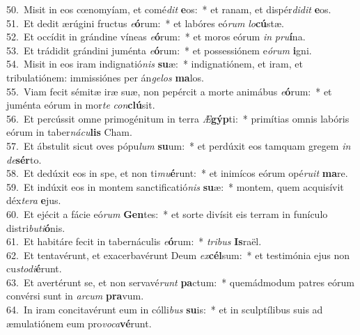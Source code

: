 {50.~}Misit in eos cœnomyíam, et comé\textit{dit} \textbf{e}os:~* et ranam, et dispér\textit{di}\textit{dit} \textbf{e}os.\\
{51.~}Et dedit ærúgini fructus \textit{e}\textbf{ó}rum:~* et labóres eó\textit{rum} \textit{lo}\textbf{cú}stæ.\\
{52.~}Et occídit in grándine víneas \textit{e}\textbf{ó}rum:~* et moros eórum \textit{in} \textit{pru}\textbf{í}na.\\
{53.~}Et trádidit grándini juménta \textit{e}\textbf{ó}rum:~* et possessiónem e\textit{ó}\textit{rum} \textbf{i}gni.\\
{54.~}Misit in eos iram indignatió\textit{nis} \textbf{su}æ:~* indignatiónem, et iram, et tribulatiónem: immissiónes per án\textit{ge}\textit{los} \textbf{ma}los.\\
{55.~}Viam fecit sémitæ iræ suæ, non pepércit a morte animábus \textit{e}\textbf{ó}rum:~* et juménta eórum in mor\textit{te} \textit{con}\textbf{clú}sit.\\
{56.~}Et percússit omne primogénitum in terra \textit{Æ}\textbf{gýp}ti:~* primítias omnis labóris eórum in taber\textit{ná}\textit{cu}\textbf{lis} Cham.\\
{57.~}Et ábstulit sicut oves pópu\textit{lum} \textbf{su}um:~* et perdúxit eos tamquam gregem \textit{in} \textit{de}\textbf{sér}to.\\
{58.~}Et dedúxit eos in spe, et non ti\textit{mu}\textbf{é}runt:~* et inimícos eórum opé\textit{ru}\textit{it} \textbf{ma}re.\\
{59.~}Et indúxit eos in montem sanctificatió\textit{nis} \textbf{su}æ:~* montem, quem acquisívit déx\textit{te}\textit{ra} \textbf{e}jus.\\
{60.~}Et ejécit a fácie eó\textit{rum} \textbf{Gen}tes:~* et sorte divísit eis terram in funículo distri\textit{bu}\textit{ti}\textbf{ó}nis.\\
{61.~}Et habitáre fecit in tabernáculis \textit{e}\textbf{ó}rum:~* \textit{tri}\textit{bus} \textbf{Is}raël.\\
{62.~}Et tentavérunt, et exacerbavérunt Deum \textit{ex}\textbf{cél}sum:~* et testimónia ejus non cu\textit{sto}\textit{di}\textbf{é}runt.\\
{63.~}Et avertérunt se, et non servavé\textit{runt} \textbf{pa}ctum:~* quemádmodum patres eórum convérsi sunt in \textit{ar}\textit{cum} \textbf{pra}vum.\\
{64.~}In iram concitavérunt eum in cólli\textit{bus} \textbf{su}is:~* et in sculptílibus suis ad æmulatiónem eum pro\textit{vo}\textit{ca}\textbf{vé}runt.\\
